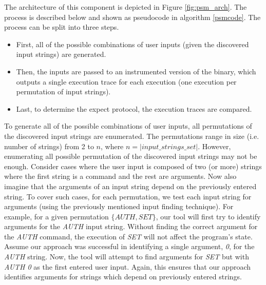 \documentclass{sig-alternate-05-2015}
\begin{document}
The architecture of this component is depicted in Figure \ref{fig:psm_arch}.
The process is described below and shown as pseudocode in algorithm \ref{psmcode}.
The process can be split into three steps.
\begin{itemize}
\item First, all of the possible combinations of user inputs (given the discovered input strings) are generated.
\item Then, the inputs are passed to an instrumented version of the binary, which outputs a single execution trace for each execution (one execution per permutation of input strings).
\item Last, to determine the expect protocol, the execution traces are compared.
\end{itemize}

To generate all of the possible combinations of user inputs, all permutations of the discovered input strings are enumerated.
The permutations range in size (i.e. number of strings) from 2 to $n$, where $n = | input\_strings\_set |$.
However, enumerating all possible permutation of the discovered input strings may not be enough. 
Consider cases where the user input is composed of two (or more) strings where the first string is a command and the rest are arguments.
Now also imagine that the arguments of an input string depend on the previously entered string.
To cover such cases, for each permutation, we test each input string for arguments (using the previously mentioned input finding technique).
For example, for a given permutation $\{AUTH, SET\}$, our tool will first try to identify arguments for the \textit{AUTH} input string.
Without finding the correct argument for the \textit{AUTH} command, the execution of \textit{SET} will not affect the program's state.
Assume our approach was successful in identifying a single argument, \textit{0}, for the \textit{AUTH} string.
Now, the tool will attempt to find arguments for \textit{SET} but with \textit{AUTH 0} as the first entered user input.
Again, this ensures that our approach identifies arguments for strings which depend on previously entered strings.
\end{document}
